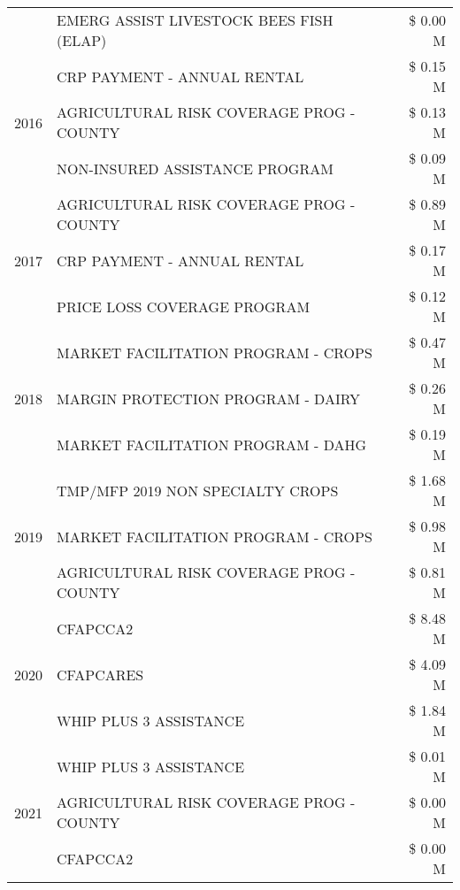 \begin{tabular}{llr}
 & EMERG ASSIST LIVESTOCK BEES FISH (ELAP) & \$ 0.00 M \\
\cline{1-3}
\multirow[t]{3}{*}{2016} & CRP PAYMENT - ANNUAL RENTAL & \$ 0.15 M \\
 & AGRICULTURAL RISK COVERAGE PROG - COUNTY & \$ 0.13 M \\
 & NON-INSURED ASSISTANCE PROGRAM & \$ 0.09 M \\
\cline{1-3}
\multirow[t]{3}{*}{2017} & AGRICULTURAL RISK COVERAGE PROG - COUNTY & \$ 0.89 M \\
 & CRP PAYMENT - ANNUAL RENTAL & \$ 0.17 M \\
 & PRICE LOSS COVERAGE PROGRAM & \$ 0.12 M \\
\cline{1-3}
\multirow[t]{3}{*}{2018} & MARKET FACILITATION PROGRAM - CROPS & \$ 0.47 M \\
 & MARGIN PROTECTION PROGRAM - DAIRY & \$ 0.26 M \\
 & MARKET FACILITATION PROGRAM - DAHG & \$ 0.19 M \\
\cline{1-3}
\multirow[t]{3}{*}{2019} & TMP/MFP 2019 NON SPECIALTY CROPS & \$ 1.68 M \\
 & MARKET FACILITATION PROGRAM - CROPS & \$ 0.98 M \\
 & AGRICULTURAL RISK COVERAGE PROG - COUNTY & \$ 0.81 M \\
\cline{1-3}
\multirow[t]{3}{*}{2020} & CFAPCCA2 & \$ 8.48 M \\
 & CFAPCARES & \$ 4.09 M \\
 & WHIP PLUS 3 ASSISTANCE & \$ 1.84 M \\
\cline{1-3}
\multirow[t]{3}{*}{2021} & WHIP PLUS 3 ASSISTANCE & \$ 0.01 M \\
 & AGRICULTURAL RISK COVERAGE PROG - COUNTY & \$ 0.00 M \\
 & CFAPCCA2 & \$ 0.00 M \\
\cline{1-3}
\bottomrule
\end{tabular}

